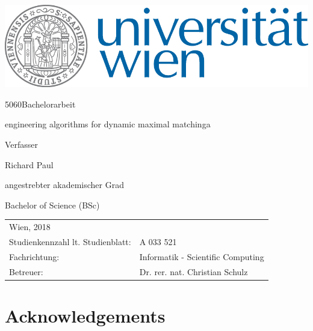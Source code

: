 \documentclass{article}      %
\makeatletter
\newcommand\HUGE{\@setfontsize\Huge{50}{60}}
\makeatother
\begin{document}

 
\thispagestyle{empty}
\begin{center}
\begin{minipage}{0.9\linewidth}
\flushright
	      		 
    \includegraphics[width=0.5\linewidth]{univie.jpg}\par
    \vspace{1.5cm}
\centering 	
	{\scshape{\HUGE Bachelorarbeit\par}}
	\vspace{1cm}
    {\scshape{\Large engineering algorithms for dynamic maximal matchinga\par}}
    \vspace{2cm}
    
  
 Verfasser  \linebreak
 {\Large Richard Paul\par}
 	\vspace{1.5cm}
angestrebter akademischer Grad\linebreak
 {\Large Bachelor of Science (BSc)\par}
	\vspace{1.5cm}

\flushleft
	

\begin{tabular}{ll}
Wien, 2018 \linebreak
\vspace{1cm}&   \\
  Studienkennzahl lt. Studienblatt: & A 033 521 \vspace{0.3cm} \\ 
  Fachrichtung: & Informatik  -  Scientific Computing \vspace{0.3cm} \\
  Betreuer: & Dr. rer. nat. Christian Schulz  \\
 \end{tabular}


    
    
\end{minipage}
\end{center}
\clearpage

\section*{Acknowledgements}
\end{document}
